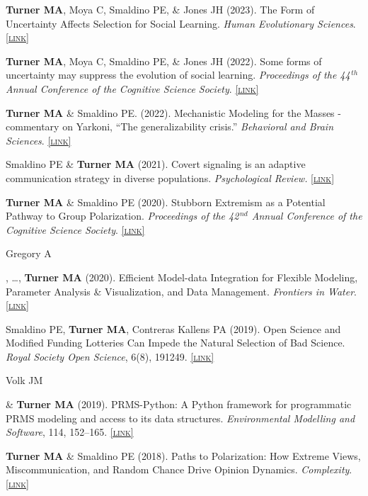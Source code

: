 \documentclass[11pt, letterpaper]{article}
\newcommand{\lurl}[1]{\href{#1}{\scriptsize\textsc{[link]}}}
\begin{document}
  \textbf{Turner MA}, Moya C, Smaldino PE, \& Jones JH (2023). The Form of
  Uncertainty Affects Selection for Social Learning. \emph{Human Evolutionary Sciences}.
  \lurl{https://www.cambridge.org/core/journals/evolutionary-human-sciences/article/form-of-uncertainty-affects-selection-for-social-learning/18B581D90A78CE094194C24C59757F5B}

  \textbf{Turner MA}, Moya C, Smaldino PE, \& Jones JH (2022). Some
  forms of uncertainty may suppress the evolution of social
  learning. \emph{Proceedings of the 44$^{\,th}$ Annual Conference
  of the Cognitive Science Society}.
  \lurl{https://psyarxiv.com/dzteh/}

  \textbf{Turner MA} \& Smaldino PE. (2022). Mechanistic Modeling for the Masses - 
  commentary on Yarkoni, ``The generalizability crisis.''
  \emph{Behavioral and Brain Sciences}.
  \lurl{https://doi.org/10.1017/S0140525X2100039X}

  Smaldino PE \& \textbf{Turner MA} (2021). Covert signaling is an adaptive communication strategy in diverse populations. \emph{Psychological Review.} \lurl{https://doi.org/10.1037/rev0000344}

  \textbf{Turner MA} \& Smaldino PE (2020). Stubborn Extremism as a Potential Pathway to Group Polarization. \emph{Proceedings of the 42$^{\,nd}$ Annual Conference of the Cognitive Science Society}. \lurl{https://cogsci.mindmodeling.org/2020/papers/0153/}

  \hypertarget{vwpaper}{Gregory A}, \ldots, \textbf{Turner MA} (2020). Efficient Model-data Integration for Flexible Modeling, Parameter Analysis \& Visualization, and Data Management. \emph{Frontiers in Water}. 
    \lurl{https://doi.org/10.3389/frwa.2020.00002}

    Smaldino PE, \textbf{Turner MA}, Contreras Kallens PA (2019). Open Science and Modified Funding Lotteries Can Impede the Natural Selection of Bad Science. \emph{Royal Society Open Science}, 6(8), 191249. \lurl{https://doi.org/10.1098/rsos.191249}

    \hypertarget{volkturner}{Volk JM} \& \textbf{Turner MA} (2019). PRMS-Python: A Python framework for programmatic PRMS modeling and access to its data structures. \emph{Environmental Modelling and Software}, 114, 152–165. \lurl{https://doi.org/10.1016/j.envsoft.2019.01.006}

    \textbf{Turner MA} \& Smaldino PE (2018). Paths to Polarization: How Extreme Views,
    Miscommunication, and Random Chance Drive Opinion Dynamics. \emph{Complexity}. \lurl{https://doi.org/10.1155/2018/2740959}
    
\end{document}
